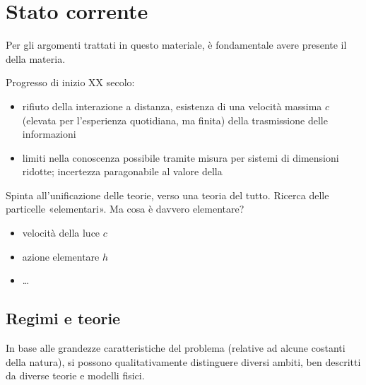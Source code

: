 \documentclass[letterpaper,10pt,italian]{jupyterBook}
\begin{document}
\sphinxstepscope


\chapter{Stato corrente}
\label{\detokenize{ch/intro/current-status:stato-corrente}}\label{\detokenize{ch/intro/current-status:physics-hs-intro-current-status}}\label{\detokenize{ch/intro/current-status::doc}}
\sphinxAtStartPar
{} Per gli argomenti trattati in questo materiale, è fondamentale avere presente il  della materia.

\sphinxAtStartPar
Progresso di inizio XX secolo:
\begin{itemize}
\item {} 
\sphinxAtStartPar
rifiuto della interazione a distanza, esistenza di una velocità massima  \(c\) (elevata per l’esperienza quotidiana, ma finita) della trasmissione delle informazioni

\item {} 
\sphinxAtStartPar
limiti nella conoscenza possibile tramite misura per sistemi di dimensioni ridotte; incertezza paragonabile al valore della {\hyperref[\detokenize{ch/intro/measurements:physics-hs-intro-measurements}]{}}

\end{itemize}

\sphinxAtStartPar
Spinta all’unificazione delle teorie, verso una teoria del tutto. Ricerca delle particelle «elementari». Ma cosa è davvero elementare?

\sphinxAtStartPar
{}
\begin{itemize}
\item {} 
\sphinxAtStartPar
velocità della luce \(c\)

\item {} 
\sphinxAtStartPar
azione elementare \(h\)

\item {} 
\sphinxAtStartPar
…

\end{itemize}


\section{Regimi e teorie}
\label{\detokenize{ch/intro/current-status:regimi-e-teorie}}\label{\detokenize{ch/intro/current-status:physics-hs-intro-current-status-regimes}}
\sphinxAtStartPar
In base alle grandezze caratteristiche del problema (relative ad alcune costanti della natura), si possono qualitativamente distinguere diversi ambiti, ben descritti da diverse teorie e modelli fisici.
\end{document}
